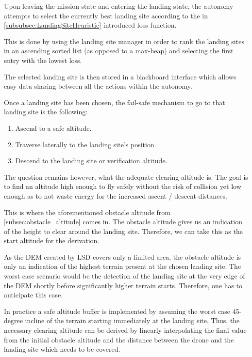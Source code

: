 Upon leaving the mission state and entering the landing state, the autonomy attempts to select the currently best landing site according to the in \cref{subsubsec:LandingSiteHeuristic} introduced loss function.

This is done by using the landing site manager in order to rank the landing sites in an ascending sorted list (as opposed to a max-heap) and selecting the first entry with the lowest loss.

The selected landing site is then stored in a blackboard interface which allows easy data sharing between all the actions within the autonomy.

Once a landing site has been chosen, the fail-safe mechanism to go to that landing site is the following:

\begin{enumerate}
    \item Ascend to a safe altitude.
    \item Traverse laterally to the landing site's position.
    \item Descend to the landing site or verification altitude.
\end{enumerate}

The question remains however, what the adequate clearing altitude is. The goal is to find an altitude high enough to fly safely without the risk of collision yet low enough as to not waste energy for the increased ascent / descent distances.

This is where the aforementioned obstacle altitude from \cref{subsec:obstacle_altitude} comes in. The obstacle altitude gives us an indication of the height to clear around the landing site. Therefore, we can take this as the start altitude for the derivation.

As the DEM created by LSD covers only a limited area, the obstacle altitude is only an indication of the highest terrain present at the chosen landing site. The worst case scenario would be the detection of the landing site at the very edge of the DEM shortly before significantly higher terrain starts. Therefore, one has to anticipate this case. 

In practice a safe altitude buffer is implemented by assuming the worst case 45-degree incline of the terrain starting immediately at the landing site. Thus, the necessary clearing altitude can be derived by linearly interpolating the final value from the initial obstacle altitude and the distance between the drone and the landing site which needs to be covered.

